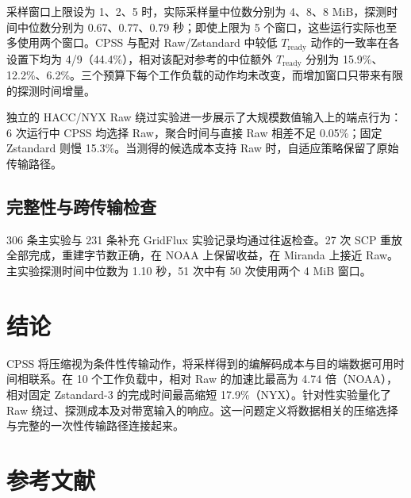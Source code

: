 \documentclass[smallabstract,smallcaptions]{dccpaper}
\renewcommand{\Section}[1]{\vspace*{-0.05in}\section{#1}\vspace{0.025in}}
\renewcommand{\SubSection}[1]{\vspace*{-0.125in}\subsection{#1}}
\begin{document}
采样窗口上限设为 1、2、5 时，实际采样量中位数分别为 4、8、8 MiB，探测时间中位数分别为 0.67、0.77、0.79 秒；即使上限为 5 个窗口，这些运行实际也至多使用两个窗口。CPSS 与配对 Raw/Zstandard 中较低 $T_{\mathrm{ready}}$ 动作的一致率在各设置下均为 4/9（44.4\%），相对该配对参考的中位额外 $T_{\mathrm{ready}}$ 分别为 15.9\%、12.2\%、6.2\%。三个预算下每个工作负载的动作均未改变，而增加窗口只带来有限的探测时间增量。

独立的 HACC/NYX Raw 绕过实验进一步展示了大规模数值输入上的端点行为：6 次运行中 CPSS 均选择 Raw，聚合时间与直接 Raw 相差不足 0.05\%；固定 Zstandard 则慢 15.3\%。当测得的候选成本支持 Raw 时，自适应策略保留了原始传输路径。

\SubSection{完整性与跨传输检查}
306 条主实验与 231 条补充 GridFlux 实验记录均通过往返检查。27 次 SCP 重放全部完成，重建字节数正确，在 NOAA 上保留收益，在 Miranda 上接近 Raw。主实验探测时间中位数为 1.10 秒，51 次中有 50 次使用两个 4 MiB 窗口。

\FloatBarrier
\Section{结论}

CPSS 将压缩视为条件性传输动作，将采样得到的编解码成本与目的端数据可用时间相联系。在 10 个工作负载中，相对 Raw 的加速比最高为 4.74 倍（NOAA），相对固定 Zstandard-3 的完成时间最高缩短 17.9\%（NYX）。针对性实验量化了 Raw 绕过、探测成本及对带宽输入的响应。这一问题定义将数据相关的压缩选择与完整的一次性传输路径连接起来。

\section*{参考文献}


\end{document}
